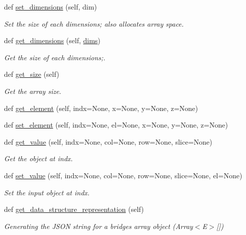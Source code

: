 \begin{DoxyCompactItemize}
def \mbox{\hyperlink{classbridges_1_1array_1_1_array_ad33c0cf22500f829d568b04b831549ec}{set\+\_\+dimensions}} (self, dim)
\begin{DoxyCompactList}\small\item\em Set the size of each dimensions; also allocates array space. \end{DoxyCompactList}\item 
def \mbox{\hyperlink{classbridges_1_1array_1_1_array_a25d42635a6bd5e8a5a6de6973b5a33a7}{get\+\_\+dimensions}} (self, \mbox{\hyperlink{classbridges_1_1array_1_1_array_a69f2c673a6077e203b3e916dd73cd243}{dims}})
\begin{DoxyCompactList}\small\item\em Get the size of each dimensions;. \end{DoxyCompactList}\item 
def \mbox{\hyperlink{classbridges_1_1array_1_1_array_a809b5997e247653ad8661661dcbeffc3}{get\+\_\+size}} (self)
\begin{DoxyCompactList}\small\item\em Get the array size. \end{DoxyCompactList}\item 
def \mbox{\hyperlink{classbridges_1_1array_1_1_array_a08753128cf55630f266bbbb0951617ba}{get\+\_\+element}} (self, indx=None, x=None, y=None, z=None)
\item 
def \mbox{\hyperlink{classbridges_1_1array_1_1_array_a922bb185972d12221a1015cd9eef04ff}{set\+\_\+element}} (self, indx=None, el=None, x=None, y=None, z=None)
\item 
def \mbox{\hyperlink{classbridges_1_1array_1_1_array_a271749a194f03805eaeb5dff1b709ce6}{get\+\_\+value}} (self, indx=None, col=None, row=None, slice=None)
\begin{DoxyCompactList}\small\item\em Get the object at \textquotesingle{}indx\textquotesingle{}. \end{DoxyCompactList}\item 
def \mbox{\hyperlink{classbridges_1_1array_1_1_array_a26b89eebfaf5dff6fc343dc4986b2119}{set\+\_\+value}} (self, indx=None, col=None, row=None, slice=None, el=None)
\begin{DoxyCompactList}\small\item\em Set the input object at \textquotesingle{}indx\textquotesingle{}. \end{DoxyCompactList}\item 
def \mbox{\hyperlink{classbridges_1_1array_1_1_array_a7c6af86feb0ec470afe56505d9ce0cc8}{get\+\_\+data\+\_\+structure\+\_\+representation}} (self)
\begin{DoxyCompactList}\small\item\em Generating the J\+S\+ON string for a bridges array object (Array$<$\+E$>$\mbox{[}\mbox{]}) \end{DoxyCompactList}\end{DoxyCompactItemize}
